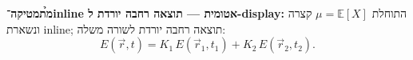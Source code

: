 \noindent\textbf{\h{מתמטיקה־inline אטומית — תוצאה רחבה יורדת ל-display:}}
התוחלת $\mu=\mathbb{E}[X]$ קצרה ונשארת inline; תוצאה רחבה יורדת לשורה משלה:
\begin{equation}
E(\vec r,t)=K_1\,E(\vec r_1,t_1)+K_2\,E(\vec r_2,t_2).
\end{equation}


